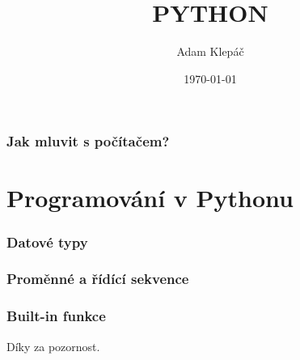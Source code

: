 \documentclass[aspectratio=169,11pt,handout]{beamer}
\title{PYTHON}
\date{\today}
\author{Adam Klepáč}
\institute[GEVO]{Gymnázium Evolution Jižní Město}
\begin{document}
\maketitle

\section[Programovací jazyky]{Jak mluvit s počítačem?}

\begin{frame}[plain]
 \sectionpage
\end{frame}



\part[Programování v Pythonu]{Programování v Pythonu}

\begin{frame}[plain]
 \partpage
\end{frame}

\section[Datové typy]{Datové typy}

\begin{frame}[plain]
 \sectionpage
\end{frame}



\section[Proměnné a řídící sekvence]{Proměnné a řídící sekvence}

\begin{frame}[plain]
 \sectionpage
\end{frame}



\section[Built-in funkce]{Built-in funkce}

\begin{frame}[plain]
 \sectionpage
\end{frame}



\begin{frame}[plain]
 \centering\Huge Díky za pozornost.
\end{frame}
\end{document}
